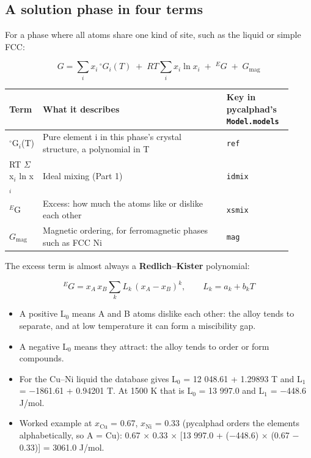 \documentclass[12pt,a4paper]{article}
\begin{document}
\subsection*{A solution phase in four terms}
For a phase where all atoms share one kind of site, such as the liquid or simple FCC:

\begin{equation*}
G = \sum_i x_i\,{}^{\circ}G_i(T) \;+\; RT\sum_i x_i \ln x_i \;+\; {}^{E}G \;+\; G_{\text{mag}}
\end{equation*}
\begingroup\small
\begin{longtable}{>{\raggedright\arraybackslash}p{0.102\linewidth}>{\raggedright\arraybackslash}p{0.604\linewidth}>{\raggedright\arraybackslash}p{0.214\linewidth}}
\toprule
\textbf{Term} & \textbf{What it describes} & \textbf{Key in pycalphad's \texttt{Model.\allowbreak{}models}} \\
\midrule
\endhead
\(^{\circ}\)G\(_{i}\)(T) & Pure element i in this phase's crystal structure, a polynomial in T & \texttt{ref} \\
RT \(\Sigma\) x\(_{i}\) ln x\(_{i}\) & Ideal mixing (Part 1) & \texttt{idmix} \\
\(^{E}\)G & Excess: how much the atoms like or dislike each other & \texttt{xsmix} \\
\(G_{\mathrm{mag}}\) & Magnetic ordering, for ferromagnetic phases such as FCC Ni & \texttt{mag} \\
\bottomrule
\end{longtable}
\endgroup
The excess term is almost always a \textbf{Redlich--Kister} polynomial:

\begin{equation*}
{}^{E}G = x_A\,x_B \sum_{k} L_k\,(x_A - x_B)^k, \qquad L_k = a_k + b_k T
\end{equation*}
\begin{itemize}
\item A positive L\(_{0}\) means A and B atoms dislike each other: the alloy tends to separate, and at low temperature it can form a miscibility gap.
\item A negative L\(_{0}\) means they attract: the alloy tends to order or form compounds.
\item For the Cu--Ni liquid the database gives L\(_{0}\) = 12 048.61 + 1.29893 T and L\(_{1}\) = \(-\)1861.61 + 0.94201 T. At 1500 K that is L\(_{0}\) = 13 997.0 and L\(_{1}\) = \(-\)448.6 J/mol.
\item Worked example at \(x_{\mathrm{Cu}}\) = 0.67, \(x_{\mathrm{Ni}}\) = 0.33 (pycalphad orders the elements alphabetically, so A = Cu): 0.67 \(\times\) 0.33 \(\times\) [13 997.0 + (\(-\)448.6) \(\times\) (0.67 \(-\) 0.33)] = 3061.0 J/mol.
\end{itemize}
\end{document}
